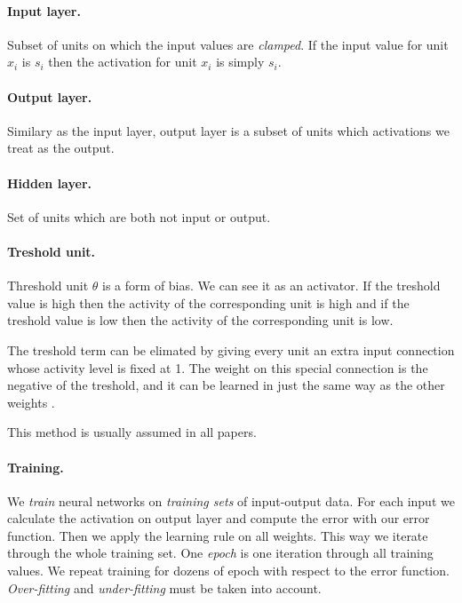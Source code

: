 \paragraph{Input layer.}
Subset of units on which the input values are \emph{clamped}. If the input value for unit $x_i$ is $s_i$ then the activation for unit $x_i$ is simply $s_i$. 

\paragraph{Output layer.}
Similary as the input layer, output layer is a subset of units which activations we treat as the output. 

\paragraph{Hidden layer.}
Set of units which are both not input or output. 

\paragraph{Treshold unit.}
Threshold unit $\theta$ is a form of bias. We can see it as an activator. If the treshold value is high then the activity of the corresponding unit is high and if the treshold value is low then the activity of the corresponding unit is low. 

The treshold term can be elimated by giving every unit an extra input connection whose activity level is fixed at 1. The weight on this special connection is the negative of the treshold, and it can be learned in just the same way as the other weights  \cite{hinton1988learning}.

This method is usually assumed in all papers. 

\paragraph{Training.}
We \emph{train} neural networks on \emph{training sets} of input-output data. For each input we calculate the activation on output layer and compute the error with our error function. Then we apply the learning rule on all weights. This way we iterate through the whole training set. One \emph{epoch} is one iteration through all training values. We repeat training for dozens of epoch with respect to the error function. \emph{Over-fitting} and \emph{under-fitting} must be taken into account.   


